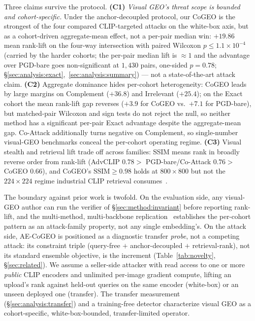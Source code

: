 Three claims survive the protocol. \textbf{(C1)} \emph{Visual GEO's threat scope is bounded and cohort-specific.} Under the anchor-decoupled protocol, our CoGEO is the strongest of the four compared CLIP-targeted attacks on the white-box axis, but as a cohort-driven aggregate-mean effect, not a per-pair median win: $+19.86$ mean rank-lift on the four-way intersection with paired Wilcoxon $p \leq 1.1 \times 10^{-4}$ (carried by the harder cohorts; the per-pair median lift is $\approx1$ and the advantage over PGD-bare goes non-significant at $1{,}430$ pairs, one-sided $p{=}0.78$; \S\ref{sec:analysis:exact},~\ref{sec:analysis:summary}) --- not a state-of-the-art attack claim. \textbf{(C2)} Aggregate dominance hides per-cohort heterogeneity: CoGEO leads by large margins on Complement ($+36.8$) and Irrelevant ($+25.4$); on the Exact cohort the mean rank-lift gap reverses ($+3.9$ for CoGEO vs.\ $+7.1$ for PGD-bare), but matched-pair Wilcoxon and sign tests do not reject the null, so neither method has a significant per-pair Exact advantage despite the aggregate-mean gap. Co-Attack additionally turns negative on Complement, so single-number visual-GEO benchmarks conceal the per-cohort operating regime. \textbf{(C3)} Visual stealth and retrieval lift trade off across families: SSIM means rank in broadly reverse order from rank-lift (AdvCLIP $0.78 >$ PGD-bare/Co-Attack $0.76 >$ CoGEO $0.66$), and CoGEO's $\mathrm{SSIM} \geq 0.98$ holds at $800 \times 800$ but not the $224 \times 224$ regime industrial CLIP retrieval consumes~\cite{radford2021clip}.

The boundary against prior work is twofold. On the evaluation side, any visual-GEO author can run the verifier of \S\ref{sec:method:invariant} before reporting rank-lift, and the multi-method, multi-backbone replication~\cite{cherti2023reproducible,fang2023eva02,zhai2023siglip} establishes the per-cohort pattern as an attack-family property, not any single embedding's. On the attack side, AE-CoGEO is positioned as a diagnostic transfer \emph{probe}, not a competing attack: its constraint triple (query-free $+$ anchor-decoupled $+$ retrieval-rank), not its standard ensemble objective, is the increment (Table~\ref{tab:novelty}, \S\ref{sec:related}). We assume a seller-side attacker with read access to one or more \emph{public} CLIP encoders and unlimited per-image gradient compute, lifting an upload's rank against held-out queries on the same encoder (white-box) or an unseen deployed one (transfer). The transfer measurement (\S\ref{sec:analysis:transfer}) and a training-free detector characterize visual GEO as a cohort-specific, white-box-bounded, transfer-limited operator.
